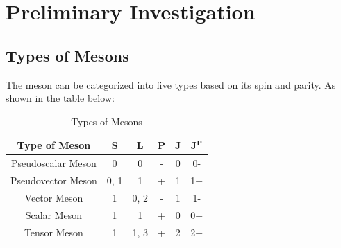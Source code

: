 \graphicspath{{Images/}}

\section{Preliminary Investigation}

\subsection{Types of Mesons}
The meson can be categorized into five types based on its spin and parity. As shown in the table below:

\begin{table}[htbp]
    \centering
    \caption{Types of Mesons}
    \vspace{4mm}
    \begin{tabular}{c | c c c c c}
        \hline \hline
        \textbf{Type of Meson} & \textbf{S} & \textbf{L} & \textbf{P} & \textbf{J} & \textbf{J$^{\textbf{P}}$} \\
        \hline
        Pseudoscalar Meson     & 0          & 0          & -          & 0          & 0-                        \\
        \hline
        Pseudovector Meson     & 0, 1       & 1          & +          & 1          & 1+                        \\
        \hline
        Vector Meson           & 1          & 0, 2       & -          & 1          & 1-                        \\
        \hline
        Scalar Meson           & 1          & 1          & +          & 0          & 0+                        \\
        \hline
        Tensor Meson           & 1          & 1, 3       & +          & 2          & 2+                        \\
        \hline\hline
    \end{tabular}
    \label{tab:mesons}
\end{table}


